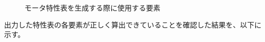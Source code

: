 \begin{figure}[p]
	\centering
	\caption{モータ特性表を生成する際に使用する要素}
	\label{fig:tekiyou_csv_wakariyasui}
\end{figure}


出力した特性表の各要素が正しく算出できていることを確認した結果を、以下に示す。

